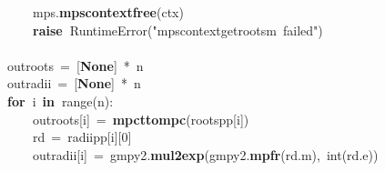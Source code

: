 \documentclass{article}\usepackage[]{graphicx}\usepackage[dvipsnames,table]{xcolor}
\makeatletter
\newcommand{\hlnum}[1]{\textcolor[rgb]{0.686,0.059,0.569}{#1}}%
\newcommand{\hlsng}[1]{\textcolor[rgb]{0.192,0.494,0.8}{#1}}%
\newcommand{\hlopt}[1]{\textcolor[rgb]{0,0,0}{#1}}%
\newcommand{\hldef}[1]{\textcolor[rgb]{0.345,0.345,0.345}{#1}}%
\newcommand{\hlkwa}[1]{\textcolor[rgb]{0.161,0.373,0.58}{\textbf{#1}}}%
\newcommand{\hlkwb}[1]{\textcolor[rgb]{0.69,0.353,0.396}{#1}}%
\newcommand{\hlkwc}[1]{\textcolor[rgb]{0.333,0.667,0.333}{#1}}%
\newcommand{\hlkwd}[1]{\textcolor[rgb]{0.737,0.353,0.396}{\textbf{#1}}}%
\newenvironment{kframe}{%
 \def\at@end@of@kframe{}%
 \ifinner\ifhmode%
  \def\at@end@of@kframe{\end{minipage}}%
  \begin{minipage}{\columnwidth}%
 \fi\fi%
 \def\FrameCommand##1{\hskip\@totalleftmargin \hskip-\fboxsep
 \colorbox{shadecolor}{##1}\hskip-\fboxsep
     \hskip-\linewidth \hskip-\@totalleftmargin \hskip\columnwidth}%
 \MakeFramed {\advance\hsize-\width
   \@totalleftmargin\z@ \linewidth\hsize
   \@setminipage}}%
 {\par\unskip\endMakeFramed%
 \at@end@of@kframe}
\newenvironment{knitrout}{}{} %
\makeatother
\begin{document}
\begin{center}
\begin{minipage}[m]{18cm}
\begin{knitrout}
\begin{kframe}
\hldef{}\hldef{\ \ \ \ \ \ \ \ }\hldef{\textunderscore mps}\hlopt{.}\hldef{}\hlkwd{mps\textunderscore context\textunderscore free}\hldef{}\hlopt{(}\hldef{ctx}\hlopt{)}\hspace*{\fill}\\
\hldef{}\hldef{\ \ \ \ \ \ \ \ }\hldef{}\hlkwa{raise\ }\hldef{}\hlkwc{RuntimeError}\hldef{}\hlopt{(}\hldef{}\hlsng{"mps\textunderscore context\textunderscore get\textunderscore roots\textunderscore m\ failed"}\hldef{}\hlopt{)}\hspace*{\fill}\\
\hldef{}\hspace*{\fill}\\
\hldef{}\hldef{\ \ \ \ }\hldef{out\textunderscore roots\ }\hlopt{=\ {[}}\hldef{}\hlkwa{None}\hldef{}\hlopt{{]}\ {*}\ }\hldef{n}\hspace*{\fill}\\
\hldef{}\hldef{\ \ \ \ }\hldef{out\textunderscore radii\ }\hlopt{=\ {[}}\hldef{}\hlkwa{None}\hldef{}\hlopt{{]}\ {*}\ }\hldef{n}\hspace*{\fill}\\
\hldef{}\hldef{\ \ \ \ }\hldef{}\hlkwa{for\ }\hldef{i\ }\hlkwa{in\ }\hldef{}\hlkwb{range}\hldef{}\hlopt{(}\hldef{n}\hlopt{):}\hspace*{\fill}\\
\hldef{}\hldef{\ \ \ \ \ \ \ \ }\hldef{out\textunderscore roots}\hlopt{{[}}\hldef{i}\hlopt{{]}\ =\ }\hldef{}\hlkwd{mpc\textunderscore t\textunderscore to\textunderscore mpc}\hldef{}\hlopt{(}\hldef{roots\textunderscore pp}\hlopt{{[}}\hldef{i}\hlopt{{]})}\hspace*{\fill}\\
\hldef{}\hldef{\ \ \ \ \ \ \ \ }\hldef{rd\ }\hlopt{=\ }\hldef{radii\textunderscore pp}\hlopt{{[}}\hldef{i}\hlopt{{]}{[}}\hldef{}\hlnum{0}\hldef{}\hlopt{{]}}\hspace*{\fill}\\
\hldef{}\hldef{\ \ \ \ \ \ \ \ }\hldef{out\textunderscore radii}\hlopt{{[}}\hldef{i}\hlopt{{]}\ =\ }\hldef{gmpy2}\hlopt{.}\hldef{}\hlkwd{mul\textunderscore 2exp}\hldef{}\hlopt{(}\hldef{gmpy2}\hlopt{.}\hldef{}\hlkwd{mpfr}\hldef{}\hlopt{(}\hldef{rd}\hlopt{.}\hldef{m}\hlopt{),\ }\hldef{}\hlkwb{int}\hldef{}\hlopt{(}\hldef{rd}\hlopt{.}\hldef{e}\hlopt{))}\hspace*{\fill}\\
\hldef{}\hspace*{\fill}\\
\hldef{}\hldef{\ \ \ \ }\hldef{}\hspace*{\fill}\\

\end{kframe}
\end{knitrout}
\end{minipage}
\end{center}
\end{document}
